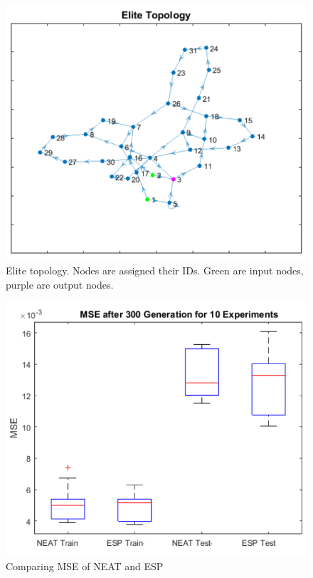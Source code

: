 \documentclass{hbrs-ecta-report}
\begin{document}
\begin{figure}[ht!]
\centering
\includegraphics[width=\linewidth]{img/3.png}
\caption{Elite topology. Nodes are assigned their IDs. Green are input nodes, purple are output nodes.}
\label{fig:3} 
\end{figure}

\begin{figure}[ht!]
\centering
\includegraphics[width=\linewidth]{img/4.png}
\caption{Comparing MSE of NEAT and ESP}
\label{fig:4} 
\end{figure}
\end{document}
